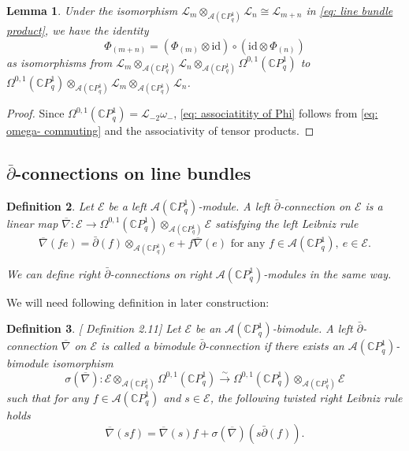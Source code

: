 \documentclass[12pt]{article}
\newtheorem{definition}{Definition}[section]
\newtheorem{lemma}[definition]{Lemma}
\numberwithin{equation}{section}
\def\id{{\text{id}}}
\def\pb{\bar{\partial}}
\def\C{{\mathbb C}}
\def\A{\mathcal{A}}
\def\L{\mathcal{L}}
\begin{document}
\begin{lemma}\label{lemma: associativity of Phi}
    Under the isomorphism $\L_m\otimes_{\A(\C P^1_q)}\L_n\cong \L_{m+n}$ in \eqref{eq: line bundle product}, we have the identity
    \begin{equation}\label{eq: associatitity of Phi}
   \Phi_{(m+n)} =(\Phi_{(m)}\otimes \id)\circ(\id\otimes \Phi_{(n)})
    \end{equation}
    as isomorphisms from $\L_m\otimes_{\A(\C P^1_q)}\L_n\otimes_{\A(\C P^1_q)} \Omega^{0,1}(\C P^1_q)$ to $\Omega^{0,1}(\C P^1_q) \otimes_{\A(\C P^1_q)} \L_m\otimes_{\A(\C P^1_q)}\L_n$.
\end{lemma}
\begin{proof}
    Since $\Omega^{0,1}(\C P^1_q)= \L_{-2}\omega_-$, \eqref{eq: associatitity of Phi} follows from \eqref{eq: omega- commuting} and the associativity of tensor products.
\end{proof}



\subsection{$\pb$-connections on line bundles}\label{subsection: standard holomorphic structures on line bundles}
\begin{definition}\label{def: left module connection}
    Let $\mathcal{E}$ be a left $\A(\C P^1_q)$-module. A left $\pb$-connection on $\mathcal{E}$ is a linear map $\overline{\nabla}: \mathcal{E}\to \Omega^{0,1}(\C P^1_q)\otimes_{\A(\C P^1_q)}\mathcal{E}$ satisfying the left Leibniz rule
    $$
    \overline{\nabla}(fe)=\pb(f)\otimes_{\A(\C P^1_q)}e+f\overline{\nabla}(e) \text{ for any } f\in \A(\C P^1_q), ~e\in \mathcal{E}.
    $$

    We can define right $\pb$-connections on right $\A(\C P^1_q)$-modules in the same way.
\end{definition}

We will need following definition in later construction:

\begin{definition}\label{def: bimodule connection}[\cite{khalkhali2011holomorphic} Definition 2.11]
    Let $\mathcal{E}$ be  an $\A(\C P^1_q)$-bimodule. A left $\pb$-connection $\overline{\nabla}$  on $\mathcal{E}$ is called a bimodule  $\pb$-connection if there exists an $\A(\C P^1_q)$-bimodule isomorphism $$\sigma(\overline{\nabla}): \mathcal{E}\otimes_{\A(\C P^1_q)}\Omega^{0,1}(\C P^1_q)\overset{\sim}{\to}\Omega^{0,1}(\C P^1_q)\otimes_{\A(\C P^1_q)}\mathcal{E}$$ such that for any $f\in \A(\C P^1_q)$ and $s\in\mathcal{E}$, the following twisted right Leibniz rule holds
    \begin{equation}
        \overline{\nabla}(sf)=\overline{\nabla}(s)f+\sigma(\overline{\nabla})(s\pb(f)).
    \end{equation}
\end{definition}
\end{document}
